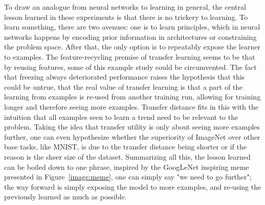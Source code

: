 \documentclass[english,twoside,openright]{UH_DS_MSc}
\begin{document}
To draw an analogue from neural networks to learning in general, the central lesson learned in these experiments 
is that there is no trickery to learning. To learn something, there are two avenues: one is to learn principles, which in 
neural networks happens by encoding prior information in architectures or constraining the problem space. After that, the only 
option is to repeatably expose the learner to examples. The feature-recycling premise of transfer learning seems to be that 
by reusing features, some of this example study could be circumvented. The fact that freezing always deteriorated performance
raises the hypothesis that this could be untrue, that the real value of transfer learning is that a part of the learning from 
examples is re-used from another training run, allowing for training longer and therefore seeing more examples. Transfer distance 
fits in this with the intuition that all examples seen to learn a trend need to be relevant to the problem. 
Taking the idea that transfer utility is only about 
seeing more examples further, one can even hypothesize whether the superiority of ImageNet over other base tasks, like MNIST, is 
due to the transfer distance being shorter or if the reason is the sheer size of the dataset. Summarizing all this, the lesson learned
can be boiled down to one phrase, inspired by the GoogLeNet inspiring meme presented in 
Figure~\ref{image:meme}, one can simply say "we need to go further"; the way forward is simply exposing the model to more examples, 
and re-using the previously learned as much as possible.
\end{document}
